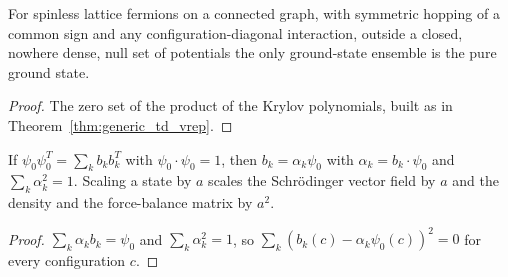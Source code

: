 \begin{theorem}
  \label{thm:generic_Ens_pure}
  \leanok
  For spinless lattice fermions on a connected graph, with symmetric hopping of a common sign and any
  configuration-diagonal interaction, outside a closed, nowhere dense, null set of potentials the only ground-state
  ensemble is the pure ground state.
\end{theorem}
\begin{proof}
  \leanok
  The zero set of the product of the Krylov polynomials, built as in Theorem~\ref{thm:generic_td_vrep}.
\end{proof}

\begin{lemma}
  \label{lem:decomp_pure}
  \leanok
  If $\psi_0\psi_0^T=\sum_kb_kb_k^T$ with $\psi_0\cdot\psi_0=1$, then $b_k=\alpha_k\psi_0$ with $\alpha_k=b_k\cdot\psi_0$
  and $\sum_k\alpha_k^2=1$. Scaling a state by $a$ scales the Schr\"odinger vector field by $a$ and the density and the
  force-balance matrix by $a^2$.
\end{lemma}
\begin{proof}
  \leanok
  $\sum_k\alpha_kb_k=\psi_0$ and $\sum_k\alpha_k^2=1$, so $\sum_k(b_k(c)-\alpha_k\psi_0(c))^2=0$ for every configuration $c$.
\end{proof}

